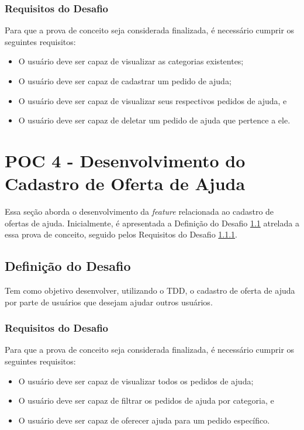 \subsubsection{Requisitos do Desafio}
\label{section:poc_3_req_desafio}

Para que a prova de conceito seja considerada finalizada, é necessário cumprir os seguintes requisitos:

\begin{itemize}
  \item O usuário deve ser capaz de visualizar as categorias existentes;
  \item O usuário deve ser capaz de cadastrar um pedido de ajuda;
  \item O usuário deve ser capaz de visualizar seus respectivos pedidos de ajuda, e
  \item O usuário deve ser capaz de deletar um pedido de ajuda que pertence a ele.
\end{itemize}

\section{POC 4 - Desenvolvimento do Cadastro de Oferta de Ajuda}
\label{section:poc_4}

Essa seção aborda o desenvolvimento da \textit{feature} relacionada ao cadastro de ofertas de ajuda. 
Inicialmente, é apresentada a Definição do Desafio \ref{section:poc_4_def_desafio} atrelada a essa 
prova de conceito, seguido pelos Requisitos do Desafio \ref{section:poc_4_req_desafio}.

\subsection{Definição do Desafio}
\label{section:poc_4_def_desafio}

Tem como objetivo desenvolver, utilizando o TDD, o cadastro de oferta de ajuda por 
parte de usuários que desejam ajudar outros usuários.

\subsubsection{Requisitos do Desafio}
\label{section:poc_4_req_desafio}

Para que a prova de conceito seja considerada finalizada, é necessário cumprir os seguintes requisitos:

\begin{itemize}
  \item O usuário deve ser capaz de visualizar todos os pedidos de ajuda;
  \item O usuário deve ser capaz de filtrar os pedidos de ajuda por categoria, e
  \item O usuário deve ser capaz de oferecer ajuda para um pedido específico.
\end{itemize}

